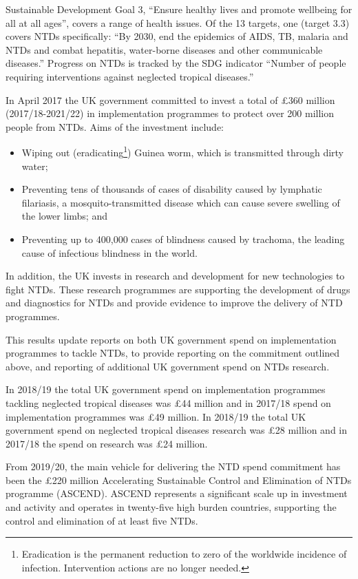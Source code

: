 Sustainable Development Goal 3, ``Ensure healthy lives and promote wellbeing for all at all ages'', covers a range of health issues. %
Of the 13 targets, one (target 3.3) covers NTDs specifically: ``By 2030, end the epidemics of AIDS, TB, malaria and NTDs and combat hepatitis, water-borne diseases and other communicable diseases.'' %
Progress on NTDs is tracked by the SDG indicator ``Number of people requiring interventions against neglected tropical diseases.'' %

In April 2017 the UK government committed to invest a total of \pounds 360 million (2017/18-2021/22) in implementation programmes to protect over 200 million people from NTDs. %
Aims of the investment include: 
\begin{itemize}
\item Wiping out (eradicating\footnote{Eradication is the permanent reduction to zero of the worldwide incidence of infection. Intervention actions are no longer needed.}) Guinea worm, which is transmitted through dirty water;
\item Preventing tens of thousands of cases of disability caused by lymphatic filariasis, a mosquito-transmitted disease which can cause severe swelling of the lower limbs; and
\item Preventing up to 400,000 cases of blindness caused by trachoma, the leading cause of infectious blindness in the world.
\end{itemize}

In addition, the UK invests in research and development for new technologies to fight NTDs. %
These research programmes are supporting the development of drugs and diagnostics for NTDs and provide evidence to improve the delivery of NTD programmes. %

This results update reports on both UK government spend on implementation programmes to tackle NTDs, to provide reporting on the commitment outlined above, and reporting of additional UK government spend on NTDs research. %

In 2018/19 the total UK government spend on implementation programmes tackling neglected tropical diseases was \pounds 44 million and in 2017/18 spend on implementation programmes was \pounds 49 million. %
In 2018/19 the total UK government spend on neglected tropical diseases research was \pounds 28 million and in 2017/18 the spend on research was \pounds 24 million. %

From 2019/20, the main vehicle for delivering the NTD spend commitment has been the \pounds 220 million Accelerating Sustainable Control and Elimination of NTDs programme (ASCEND). %
ASCEND represents a significant scale up in investment and activity and operates in twenty-five high burden countries, supporting the control and elimination of at least five NTDs. %

\newpage
